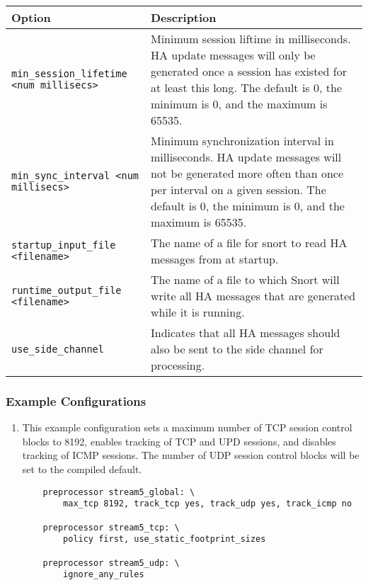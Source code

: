 \documentclass[english]{report}
\begin{document}
\begin{center}
\begin{tabular}{| l | p{4.5in} |}

\hline
\textbf{Option} & \textbf{Description}\\
\hline 

\hline 
\texttt{min\_session\_lifetime <num millisecs>} &

Minimum session liftime in milliseconds.  HA update messages will only be generated once a session has existed for
at least this long.  The default is 0, the minimum is 0, and the maximum is 65535.\\

\hline 
\texttt{min\_sync\_interval <num millisecs>} &

Minimum synchronization interval in milliseconds.  HA update messages will not be generated more often than
once per interval on a given session.  The default is 0, the minimum is 0, and the maximum is 65535.\\

\hline
\texttt{startup\_input\_file <filename>} &

The name of a file for snort to read HA messages from at startup.\\

\hline
\texttt{runtime\_output\_file <filename>} &

The name of a file to which Snort will write all HA messages that are generated while it is running.\\

\hline
\texttt{use\_side\_channel} &

Indicates that all HA messages should also be sent to the side channel for processing.\\

\hline
\end{tabular}
\end{center}

\subsubsection{Example Configurations}

\begin{enumerate}

\item{}

This example configuration sets a maximum number of TCP session control blocks to 8192, 
enables tracking of TCP and UPD sessions, and disables tracking of ICMP sessions.  The 
number of UDP session control blocks will be set to the compiled default. 

\begin{verbatim}
    preprocessor stream5_global: \
        max_tcp 8192, track_tcp yes, track_udp yes, track_icmp no

    preprocessor stream5_tcp: \
        policy first, use_static_footprint_sizes

    preprocessor stream5_udp: \
        ignore_any_rules
\end{verbatim}

\end{enumerate}
\end{document}
